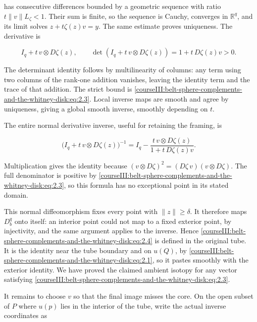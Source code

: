 has consecutive differences bounded by a geometric sequence with ratio \(t\|v\|L_\zeta<1\). Their sum is finite, so the sequence is Cauchy, converges in \(\mathbb R^q\), and its limit solves \(z+t\zeta(z)v=y\). The same estimate proves uniqueness. The derivative is

\begin{equation}
I_q+t\,v\otimes D\zeta(z),\qquad
\det(I_q+t\,v\otimes D\zeta(z))
=1+t\,D\zeta(z)v>0.
\label{courseIII:belt-sphere-complements-and-the-whitney-disk:eq:2.7}
\end{equation}

The determinant identity follows by multilinearity of columns: any term using two columns of the rank-one addition vanishes, leaving the identity term and the trace of that addition. The strict bound is \eqref{courseIII:belt-sphere-complements-and-the-whitney-disk:eq:2.3}. Local inverse maps are smooth and agree by uniqueness, giving a global smooth inverse, smoothly depending on \(t\).

The entire normal derivative inverse, useful for retaining the framing, is

\begin{equation}
\bigl(I_q+t\,v\otimes D\zeta(z)\bigr)^{-1}
=I_q-\frac{t\,v\otimes D\zeta(z)}
{1+t\,D\zeta(z)v}.
\label{courseIII:belt-sphere-complements-and-the-whitney-disk:eq:2.7a}
\end{equation}

Multiplication gives the identity because
\((v\otimes D\zeta)^2=(D\zeta\,v)(v\otimes D\zeta)\).
The full denominator is positive by \eqref{courseIII:belt-sphere-complements-and-the-whitney-disk:eq:2.3}, so this formula has no exceptional point in its stated domain.

This normal diffeomorphism fixes every point with \(\|z\|\geq\delta\). It therefore maps \(D_b^q\) onto itself: an interior point could not map to a fixed exterior point, by injectivity, and the same argument applies to the inverse. Hence \eqref{courseIII:belt-sphere-complements-and-the-whitney-disk:eq:2.4} is defined in the original tube. It is the identity near the tube boundary and on \(u(Q)\), by \eqref{courseIII:belt-sphere-complements-and-the-whitney-disk:eq:2.1}, so it pastes smoothly with the exterior identity. We have proved the claimed ambient isotopy for any vector satisfying \eqref{courseIII:belt-sphere-complements-and-the-whitney-disk:eq:2.3}.

It remains to choose \(v\) so that the final image misses the core. On the open subset of \(P\) where \(u(p)\) lies in the interior of the tube, write the actual inverse coordinates as

